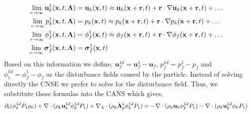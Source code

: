 \documentclass[11pt]{My_preprint}
\begin{document}
\begin{align}
    \lim_{r \to \infty}  \textbf{u}_k^1(\textbf{x},t,\bm\Lambda)
    &= \textbf{u}_k(\textbf{x},t)
    \approx \textbf{u}_k(\textbf{x}+\textbf{r},t)
    + \textbf{r} \cdot \mathbf{\nabla} \textbf{u}_k(\textbf{x}+\textbf{r},t) 
    + \ldots\\
    \lim_{r \to \infty}  p_k^1(\textbf{x},t,\bm\Lambda)
    &= p_k(\textbf{x},t)
    \approx p_k(\textbf{x}+\textbf{r},t)
    + \textbf{r} \cdot \mathbf{\nabla} p_k(\textbf{x}+\textbf{r},t) 
    + \ldots\\
    \lim_{r \to \infty}  \phi_f^1(\textbf{x},t,\bm\Lambda)
    &= \phi_f^1(\textbf{x},t)
    \approx \phi_f(\textbf{x}+\textbf{r},t)
    + \textbf{r} \cdot \mathbf{\nabla} \phi_f(\textbf{x}+\textbf{r},t) 
    + \ldots\\
    \lim_{r \to \infty}  \bm\sigma_f^1(\textbf{x},t,\bm\Lambda)
    &= \bm\sigma_f^1(\textbf{x},t)
\end{align}
Based on this information we define, $\textbf{u}_f^{1d} = \textbf{u}_f^1 - \textbf{u}_f$, $p_f^{1d} = p_f^1 - p_f$ and $\phi_1^{1d} = \phi_f^1 - \phi_f$ as the disturbance fields caused by the particle. 
Instead of solving directly the CNSE we prefer to solve for the disturbance field. 
Thus, we substitute these formulas into the CANS which gives, 
\begin{equation}
    \partial_t ( \phi_k^{1d} P_1  \rho_k )
    + \mathbf{\nabla}\cdot (\rho_k  \textbf{u}_k^{1d} \phi_k^{1d} P_1 )
    +  \mathbf{\nabla}_\Lambda \cdot ( \rho_k \dot{\bm\Lambda}_p^1 \phi_k^{1d} P_1 )
    = 
    - \mathbf{\nabla}\cdot (\rho_k  \textbf{u}_k \phi_k^{1d} P_1 )
    - \mathbf{\nabla}\cdot (\rho_k  \textbf{u}_k^{1d} \phi_k P_1 )
\end{equation}
\end{document}
